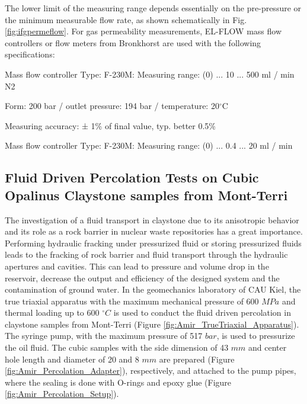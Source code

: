 The lower limit of the measuring range depends essentially on the pre-pressure or the minimum measurable flow rate, as shown schematically in Fig. \ref{fig:ifgpermeflow}.
%
For gas permeability measurements, EL-FLOW mass flow controllers or flow meters from Bronkhorst are used with the following specifications:

\begin{list}{-}{\leftmargin=1em \itemindent=0em \itemsep=0em}
\item Mass flow controller Type: F-230M: Measuring range: (0) ... 10 ... 500 ml / min N2
\item Form: 200 bar / outlet pressure: 194 bar / temperature: 20$^\circ$C
\item Measuring accuracy: ± 1\% of final value, typ. better 0.5\%
\item Mass flow controller Type: F-230M: Measuring range: (0) ... 0.4 ... 20 ml / min
\end{list}


\subsection{Fluid Driven Percolation Tests on Cubic Opalinus Claystone samples from Mont-Terri}
\label{sec:Percolation_Claystone_Exp}
The investigation of a fluid transport in claystone due to its anisotropic behavior and its role as a rock barrier in nuclear waste repositories has a great importance. Performing hydraulic fracking under pressurized fluid or storing pressurized fluids leads to the fracking of rock barrier and fluid transport through the hydraulic apertures and cavities. This can lead to pressure and volume drop in the reservoir, decrease the output and efficiency of the designed system and the contamination of ground water. In the geomechanics laboratory of CAU Kiel, the true triaxial apparatus with the maximum mechanical pressure of 600 $MPa$ and thermal loading up to 600 $^{\circ}C$ is used to conduct the fluid driven percolation in claystone samples from Mont-Terri (Figure \ref{fig:Amir_TrueTriaxial_Apparatus}). The syringe pump, with the maximum pressure of 517 $bar$, is used to pressurize the oil fluid. The cubic samples with the side dimension of 43 $mm$ and center hole length and diameter of 20 and 8 $mm$ are prepared (Figure \ref{fig:Amir_Percolation_Adapter}), respectively, and attached to the pump pipes, where the sealing is done with O-rings and epoxy glue (Figure \ref{fig:Amir_Percolation_Setup}). 

